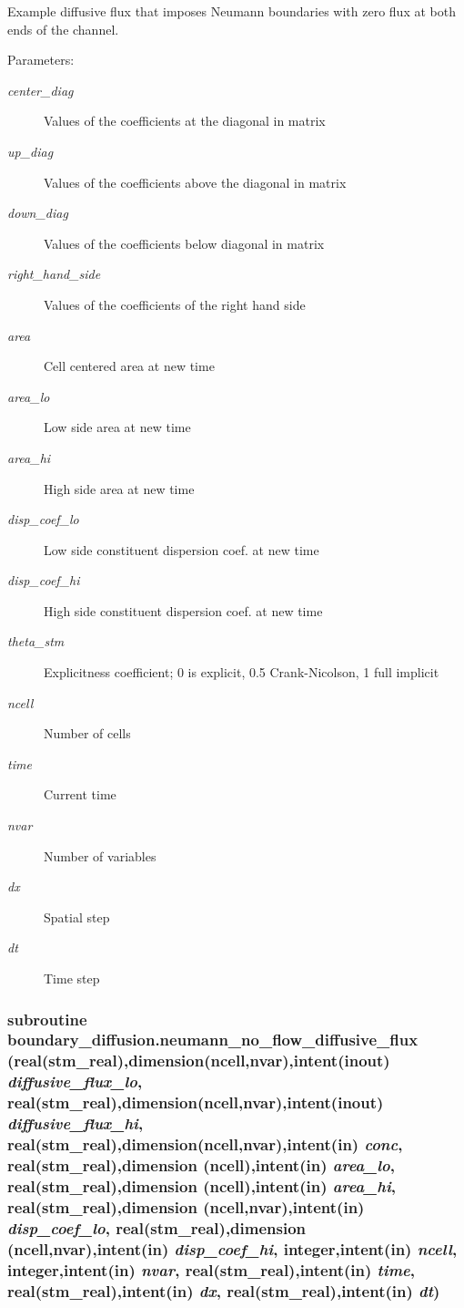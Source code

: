 Example diffusive flux that imposes Neumann boundaries with zero flux at both ends of the channel. 

\begin{Desc}
\item[Parameters:]
\begin{description}
\item[{\em center\_\-diag}]Values of the coefficients at the diagonal in matrix\item[{\em up\_\-diag}]Values of the coefficients above the diagonal in matrix\item[{\em down\_\-diag}]Values of the coefficients below diagonal in matrix\item[{\em right\_\-hand\_\-side}]Values of the coefficients of the right hand side\item[{\em area}]Cell centered area at new time \item[{\em area\_\-lo}]Low side area at new time\item[{\em area\_\-hi}]High side area at new time \item[{\em disp\_\-coef\_\-lo}]Low side constituent dispersion coef. at new time\item[{\em disp\_\-coef\_\-hi}]High side constituent dispersion coef. at new time\item[{\em theta\_\-stm}]Explicitness coefficient; 0 is explicit, 0.5 Crank-Nicolson, 1 full implicit \item[{\em ncell}]Number of cells\item[{\em time}]Current time\item[{\em nvar}]Number of variables\item[{\em dx}]Spatial step \item[{\em dt}]Time step \end{description}
\end{Desc}
\hypertarget{a00054_02070fde3498e9ffef285f98f6648fb7}{
\subsubsection[{neumann\_\-no\_\-flow\_\-diffusive\_\-flux}]{\setlength{\rightskip}{0pt plus 5cm}subroutine boundary\_\-diffusion.neumann\_\-no\_\-flow\_\-diffusive\_\-flux (real(stm\_\-real),dimension(ncell,nvar),intent(inout) {\em diffusive\_\-flux\_\-lo}, \/  real(stm\_\-real),dimension(ncell,nvar),intent(inout) {\em diffusive\_\-flux\_\-hi}, \/  real(stm\_\-real),dimension(ncell,nvar),intent(in) {\em conc}, \/  real(stm\_\-real),dimension         (ncell),intent(in) {\em area\_\-lo}, \/  real(stm\_\-real),dimension         (ncell),intent(in) {\em area\_\-hi}, \/  real(stm\_\-real),dimension (ncell,nvar),intent(in) {\em disp\_\-coef\_\-lo}, \/  real(stm\_\-real),dimension (ncell,nvar),intent(in) {\em disp\_\-coef\_\-hi}, \/  integer,intent(in) {\em ncell}, \/  integer,intent(in) {\em nvar}, \/  real(stm\_\-real),intent(in) {\em time}, \/  real(stm\_\-real),intent(in) {\em dx}, \/  real(stm\_\-real),intent(in) {\em dt})}}

